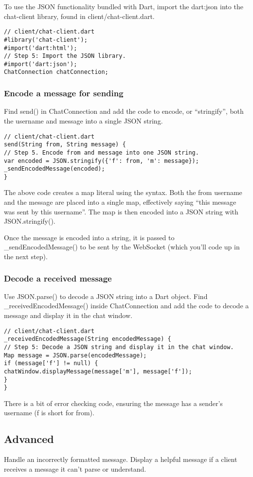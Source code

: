 To use the JSON functionality bundled with Dart, import the dart:json into the chat-client library, found in client/chat-client.dart.

\begin{verbatim}
// client/chat-client.dart
#library('chat-client');
#import('dart:html');
// Step 5: Import the JSON library.
#import('dart:json');
ChatConnection chatConnection;
\end{verbatim}

\subsubsection{Encode a message for sending}

Find send() in ChatConnection and add the code to encode, or “stringify”, both the username and message into a single JSON string.

\begin{verbatim}
// client/chat-client.dart
send(String from, String message) {
// Step 5. Encode from and message into one JSON string.
var encoded = JSON.stringify({'f': from, 'm': message});
_sendEncodedMessage(encoded);
}
\end{verbatim}

The above code creates a map literal using the { } syntax. Both the from username and the message are placed into a single map, effectively saying “this message was sent by this username”. The map is then encoded into a JSON string with JSON.stringify().

Once the message is encoded into a string, it is passed to \_sendEncodedMessage() to be sent by the WebSocket (which you’ll code up in the next step).

\subsubsection{Decode a received message}

Use JSON.parse() to decode a JSON string into a Dart object. Find \_receivedEncodedMessage() inside ChatConnection and add the code to decode a message and display it in the chat window.

\begin{verbatim}
// client/chat-client.dart
_receivedEncodedMessage(String encodedMessage) {
// Step 5: Decode a JSON string and display it in the chat window.
Map message = JSON.parse(encodedMessage);
if (message['f'] != null) {
chatWindow.displayMessage(message['m'], message['f']);
}
}
\end{verbatim}

There is a bit of error checking code, ensuring the message has a sender’s username (f is short for from).

\subsection{Advanced}

Handle an incorrectly formatted message. Display a helpful message if a client receives a message it can't parse or understand.

